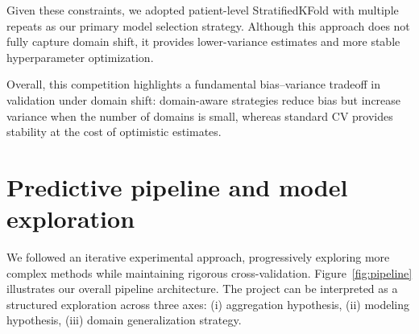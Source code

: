 \documentclass[11pt,a4paper]{article}
\begin{document}
Given these constraints, we adopted patient-level StratifiedKFold with multiple repeats as our primary model selection strategy. 
Although this approach does not fully capture domain shift, it provides lower-variance estimates and more stable hyperparameter optimization.

Overall, this competition highlights a fundamental bias–variance tradeoff in validation under domain shift: domain-aware strategies reduce bias but increase variance when the number of domains is small, whereas standard CV provides stability at the cost of optimistic estimates.

\newpage
\section{Predictive pipeline and model exploration}
\label{sec:models}

We followed an iterative experimental approach, progressively exploring more complex methods while maintaining rigorous cross-validation. Figure~\ref{fig:pipeline} illustrates our overall pipeline architecture.
The project can be interpreted as a structured exploration across three axes:
(i) aggregation hypothesis,
(ii) modeling hypothesis,
(iii) domain generalization strategy.
\end{document}
